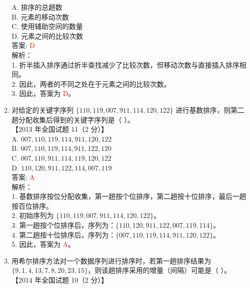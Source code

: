 \documentclass[lang=cn,newtx,10pt,scheme=chinese]{../../../elegantbook}
\begin{document}
\begin{enumerate}
    A. 排序的总趟数 \\  
    B. 元素的移动次数 \\  
    C. 使用辅助空间的数量 \\  
    D. 元素之间的比较次数 \\

    答案: \textcolor{red}{D} \\

    解析：\\
    1. 折半插入排序通过折半查找减少了比较次数，但移动次数与直接插入排序相同。\\
    2. 因此，两者的不同之处在于元素之间的比较次数。\\
    3. 因此，答案为 \textcolor{red}{D}。\\
    \item 对给定的关键字序列 $\{110, 119, 007, 911, 114, 120, 122\}$ 进行基数排序，则第二趟分配收集后得到的关键字序列是（ ）。\\
    【2013 年全国试题 11（2 分）】\\

    A. $007, 110, 119, 114, 911, 120, 122$ \\  
    B. $007, 110, 119, 114, 911, 122, 120$ \\  
    C. $007, 110, 911, 114, 119, 120, 122$ \\  
    D. $110, 120, 911, 122, 114, 007, 119$ \\

    答案: \textcolor{red}{A} \\

    解析：\\
    1. 基数排序按位分配收集，第一趟按个位排序，第二趟按十位排序，最后一趟按百位排序。\\
    2. 初始序列为 $\{110, 119, 007, 911, 114, 120, 122\}$。\\
    3. 第一趟按个位排序后，序列为：$\{110, 120, 911, 122, 007, 119, 114\}$。\\
    4. 第二趟按十位排序后，序列为：$\{007, 110, 119, 114, 911, 120, 122\}$。\\
    5. 因此，答案为 \textcolor{red}{A}。\\ 

    \item 用希尔排序方法对一个数据序列进行排序时，若第一趟排序结果为 $\{9, 1, 4, 13, 7, 8, 20, 23, 15\}$，则该趟排序采用的增量（间隔）可能是（ ）。\\
    【2014 年全国试题 10（2 分）】\\


\end{enumerate}
\end{document}
